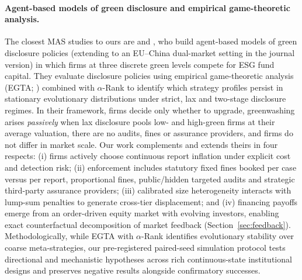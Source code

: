 \documentclass[11pt]{article}
\begin{document}
\paragraph{Agent-based models of green disclosure and empirical game-theoretic analysis.}
The closest MAS studies to ours are \citet{zhao2025agent} and \citet{zhao2026green}, who build agent-based models of green disclosure policies (extending to an EU--China dual-market setting in the journal version) in which firms at three discrete green levels compete for ESG fund capital. They evaluate disclosure policies using empirical game-theoretic analysis (EGTA; \citealp{wellman2025empirical}) combined with $\alpha$-Rank \citep{omidshafiei2019alpharank} to identify which strategy profiles persist in stationary evolutionary distributions under strict, lax and two-stage disclosure regimes. In their framework, firms decide only whether to upgrade, greenwashing arises \emph{passively} when lax disclosure pools low- and high-green firms at their average valuation, there are no audits, fines or assurance providers, and firms do not differ in market scale. Our work complements and extends theirs in four respects: (i) firms actively choose continuous report inflation under explicit cost and detection risk; (ii) enforcement includes statutory fixed fines booked per case versus per report, proportional fines, public/hidden targeted audits and strategic third-party assurance providers; (iii) calibrated size heterogeneity interacts with lump-sum penalties to generate cross-tier displacement; and (iv) financing payoffs emerge from an order-driven equity market with evolving investors, enabling exact counterfactual decomposition of market feedback (Section~\ref{sec:feedback}). Methodologically, while EGTA with $\alpha$-Rank identifies evolutionary stability over coarse meta-strategies, our pre-registered paired-seed simulation protocol tests directional and mechanistic hypotheses across rich continuous-state institutional designs and preserves negative results alongside confirmatory successes.
\end{document}
